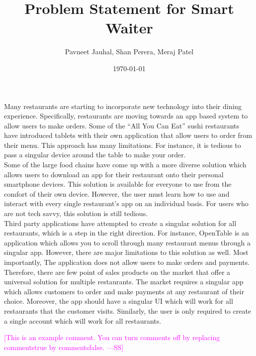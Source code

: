 \documentclass[12pt]{article}
\newcommand{\authornote}[3]{\textcolor{#1}{[#3 ---#2]}}
\newcommand{\authornote}[3]{}
\newcommand{\wss}[1]{\authornote{magenta}{SS}{#1}}
\begin{document}
\title{Problem Statement for Smart Waiter} 
\author{Pavneet Jauhal, Shan Perera, Meraj Patel}
\date{\today}

\maketitle

	Many restaurants are starting to incorporate new technology into their dining experience. Specifically, restaurants are moving towards an app based system to allow users to make orders. Some of the ``All You Can Eat'' sushi restaurants have introduced tablets with their own application that allow users to order from their menu. This approach has many limitations. For instance, it is tedious to pass a singular device around the table to make your order. \\
	
	Some of the large food chains have come up with a more diverse solution which allows users to download an app for their restaurant onto their personal smartphone devices. This solution is available for everyone to use from the comfort of their own device. However, the user must learn how to use and interact with every single restaurant's app on an individual basis.  For users who are not tech savvy, this solution is still tedious.\\
	
	Third party applications have attempted to create a singular solution for all restaurants, which is a step in the right direction. For instance, OpenTable is an application which allows you to scroll through many restaurant menus through a singular app. However, there are major limitations to this solution as well. Most importantly, The application does not allow users to make orders and payments.\\
	
	Therefore, there are few point of sales products on the market that offer a universal solution for multiple restaurants.  The market requires a singular app which allows customers to order and make payments at any restaurant of their choice. Moreover, the app should have a singular UI which will work for all restaurants that the customer visits. Similarly, the user is only required to create a single account which will work for all restaurants.


\wss{This is an example comment.  You can turn comments off by replacing
  commentstrue by commentsfalse.}
\end{document}
